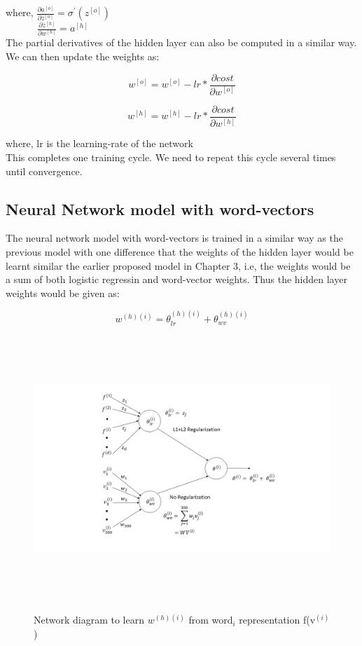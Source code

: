where, $\frac{\partial a^{[o]}}{\partial z^{[o]}} =  \sigma^{'}(z^{[o]})$\\

$\quad\qquad\ \frac{\partial z^{[h]}}{\partial w^{[h]}} = a^{[h]}$ \\

The partial derivatives of the hidden layer can also be computed in a similar way. We can then update the weights as:

\begin{equation}
w^{[o]} = w^{[o]} - lr * \frac{\partial cost}{\partial w^{[o]}}
\end{equation}

\begin{equation}
w^{[h]} = w^{[h]} - lr * \frac{\partial cost}{\partial w^{[h]}}
\end{equation}

where, lr is the learning-rate of the network\\

This completes one training cycle. We need to repeat this cycle several times until convergence.

\newpage
\subsection{Neural Network model with word-vectors}

The neural network model with word-vectors is trained in a similar way as the previous model with one difference that the weights of the hidden layer would be learnt similar the earlier proposed model in Chapter 3, i.e, the weights would be a sum of both logistic regressin and word-vector weights. Thus the hidden layer weights would be given as:

\begin{equation}
w^{(h)(i)} = \theta_{lr}^{(h)(i)} + \theta_{wv}^{(h)(i)}
\end{equation}

\begin{figure}[htbp]
\centering
\includegraphics[width=16cm, height=10cm]{images/Fig3.jpg}\\
\centering
\caption{Network diagram to learn $w^{(h)(i)}$ from word$_{i}$ representation f(v$^{(i)}$)}
\label{fig:foo}
\end{figure}

